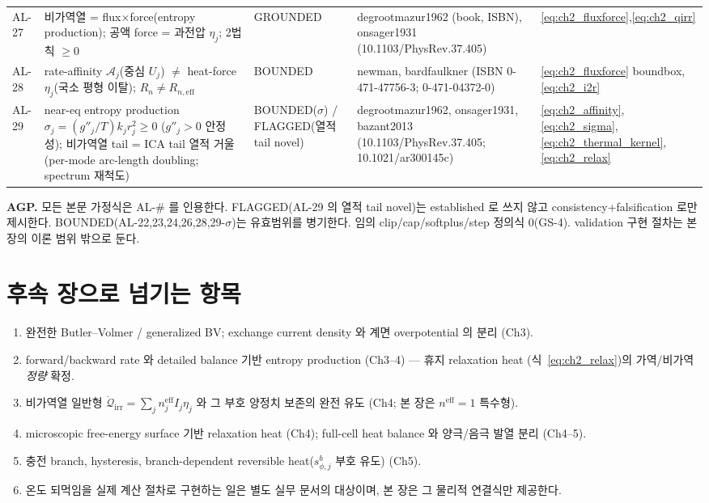 \documentclass[11pt,a4paper]{article}
\newcommand{\eff}{\mathrm{eff}}
\newcommand{\irr}{\mathrm{irr}}
\begin{document}
{\begin{longtable}{p{} p{} p{} p{} p{}}
AL-27 & 비가역열 = flux$\times$force(entropy production); 공액 force = 과전압 $\eta_j$; 2법칙 $\ge0$ & GROUNDED & degrootmazur1962 (book, ISBN), onsager1931 (10.1103/PhysRev.37.405) & \eqref{eq:ch2_fluxforce},\eqref{eq:ch2_qirr} \\
AL-28 & rate-affinity $\mathcal A_j$(중심 $U_j$) $\ne$ heat-force $\eta_j$(국소 평형 이탈); $R_n\ne R_{n,\eff}$ & BOUNDED & newman, bardfaulkner (ISBN 0-471-47756-3; 0-471-04372-0) & \eqref{eq:ch2_fluxforce} boundbox,\eqref{eq:ch2_i2r} \\
AL-29 & near-eq entropy production $\sigma_j=(g''_j/T)k_j r_j^2\ge0$ ($g''_j>0$ 안정성); 비가역열 tail = ICA tail 열적 거울 (per-mode arc-length doubling; spectrum 재척도) & BOUNDED($\sigma$) / FLAGGED(열적 tail novel) & degrootmazur1962, onsager1931, bazant2013 (10.1103/PhysRev.37.405; 10.1021/ar300145c) & \eqref{eq:ch2_affinity},\eqref{eq:ch2_sigma},\eqref{eq:ch2_thermal_kernel},\eqref{eq:ch2_relax} \\
\bottomrule
\end{longtable}
}
\textbf{AGP.} 모든 본문 가정식은 AL-\# 를 인용한다. FLAGGED(AL-29 의 열적 tail novel)는 established 로 쓰지
않고 consistency+falsification 로만 제시한다. BOUNDED(AL-22,23,24,26,28,29-$\sigma$)는 유효범위를 병기한다.
임의 clip/cap/softplus/step 정의식 0(GS-4). validation 구현 절차는 본 장의 이론 범위 밖으로 둔다.

\section{후속 장으로 넘기는 항목}\label{sec:ch2_transmit}
\begin{enumerate}[label=\arabic*),leftmargin=2.0em]
\item 완전한 Butler--Volmer / generalized BV; exchange current density 와 계면 overpotential 의 분리 (Ch3).
\item forward/backward rate 와 detailed balance 기반 entropy production (Ch3--4) — 휴지 relaxation heat
  (식~\eqref{eq:ch2_relax})의 가역/비가역 \emph{정량} 확정.
\item 비가역열 일반형 $\dot{\mathcal Q}_{\irr}=\sum_j n_j^{\eff}I_j\eta_j$ 와 그 부호 양정치 보존의 완전 유도
  (Ch4; 본 장은 $n^\eff=1$ 특수형).
\item microscopic free-energy surface 기반 relaxation heat (Ch4); full-cell heat balance 와 양극/음극 발열
  분리 (Ch4--5).
\item 충전 branch, hysteresis, branch-dependent reversible heat($s_{\phi,j}^b$ 부호 유도) (Ch5).
\item 온도 되먹임을 실제 계산 절차로 구현하는 일은 별도 실무 문서의 대상이며, 본 장은 그 물리적 연결식만 제공한다.
\end{enumerate}
\end{document}
